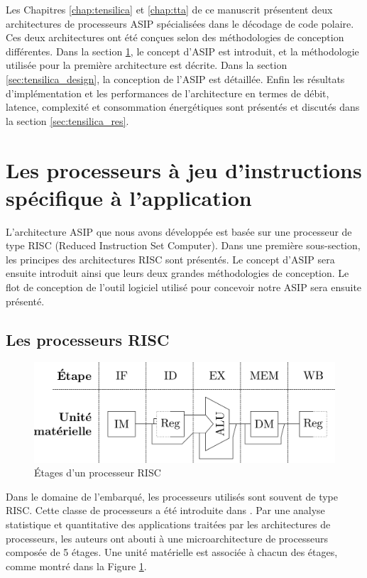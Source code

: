 Les Chapitres \ref{chap:tensilica} et \ref{chap:tta} de ce manuscrit présentent deux architectures de processeurs ASIP spécialisées dans le décodage de code polaire. Ces deux architectures ont été conçues selon des méthodologies de conception différentes. Dans la section \ref{sec:asips}, le concept d'ASIP est introduit, et la méthodologie utilisée pour la première architecture est décrite. Dans la section \ref{sec:tensilica_design}, la conception de l'ASIP est détaillée. Enfin les résultats d'implémentation et les performances de l'architecture en termes de débit, latence, complexité et consommation énergétiques sont présentés et discutés dans la section \ref{sec:tensilica_res}.


\section{Les processeurs à jeu d'instructions spécifique à l'application}
\label{sec:asips}

L'architecture ASIP que nous avons développée est basée sur une processeur de type RISC (Reduced Instruction Set Computer). Dans une première sous-section, les principes des architectures RISC sont présentés. Le concept d'ASIP sera ensuite introduit ainsi que leurs deux grandes méthodologies de conception. Le flot de conception de l'outil logiciel utilisé pour concevoir notre ASIP sera ensuite présenté.

\subsection{Les processeurs RISC}
\label{subsec:risc}
\begin{figure}[t]
\centering
\includegraphics[width=\textwidth]{main/ch3_fig/stages}
\caption{\'Etages d'un processeur RISC}
\label{fig:risc}
\end{figure}

Dans le domaine de l'embarqué, les processeurs utilisés sont souvent de type RISC. Cette classe de processeurs a été introduite dans \cite{hennessy2011computer}. Par une analyse statistique et quantitative des applications traitées par les architectures de processeurs, les auteurs ont abouti à une microarchitecture de processeurs composée de 5 étages. Une unité matérielle est associée à chacun des étages, comme montré dans la Figure \ref{fig:risc}.

